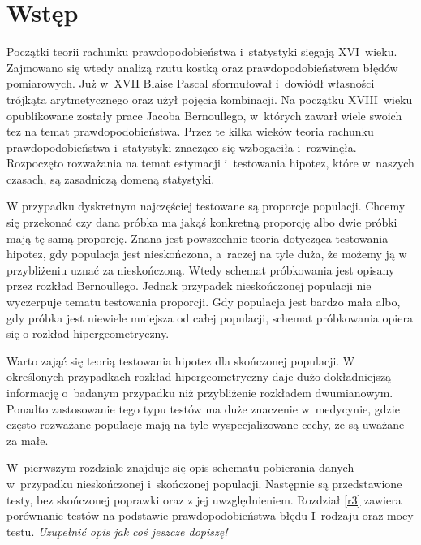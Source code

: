 \chapter*{Wstęp}
Początki teorii rachunku prawdopodobieństwa i~statystyki sięgają XVI~wieku. Zajmowano się wtedy analizą rzutu kostką oraz prawdopodobieństwem błędów pomiarowych. Już w~XVII Blaise Pascal sformułował i~dowiódł własności trójkąta arytmetycznego oraz użył pojęcia kombinacji. Na początku XVIII~wieku opublikowane zostały prace Jacoba Bernoullego, w~których zawarł wiele swoich tez na temat prawdopodobieństwa. Przez te kilka wieków teoria rachunku prawdopodobieństwa i~statystyki znacząco się wzbogaciła i~rozwinęła. Rozpoczęto rozważania na temat estymacji i~testowania hipotez, które w~naszych czasach, są zasadniczą domeną statystyki.

W przypadku dyskretnym najczęściej testowane są proporcje populacji. Chcemy się przekonać czy dana próbka ma jakąś konkretną proporcję albo dwie próbki mają tę samą proporcję. Znana jest powszechnie teoria dotycząca testowania hipotez, gdy populacja jest nieskończona, a~raczej na tyle duża, że możemy ją w przybliżeniu uznać za nieskończoną. Wtedy schemat próbkowania jest opisany przez rozkład Bernoullego. Jednak przypadek nieskończonej populacji nie wyczerpuje tematu testowania proporcji. Gdy populacja jest bardzo mała albo, gdy próbka jest niewiele mniejsza od całej populacji, schemat próbkowania opiera się o rozkład hipergeometryczny. 

Warto zająć się teorią testowania hipotez dla skończonej populacji. W określonych przypadkach rozkład hipergeometryczny daje dużo dokładniejszą informację o~badanym przypadku niż przybliżenie rozkładem dwumianowym. Ponadto zastosowanie tego typu testów ma duże znaczenie w~medycynie, gdzie często rozważane populacje mają na tyle wyspecjalizowane cechy, że są uważane za małe.

W~pierwszym rozdziale znajduje się opis schematu pobierania danych w~przypadku nieskończonej i~skończonej populacji. Następnie są przedstawione testy, bez skończonej poprawki oraz z jej uwzględnieniem. Rozdział \ref{r3} zawiera porównanie testów na podstawie prawdopodobieństwa błędu I~rodzaju oraz mocy testu. \textit{Uzupełnić opis jak coś jeszcze dopiszę!}
